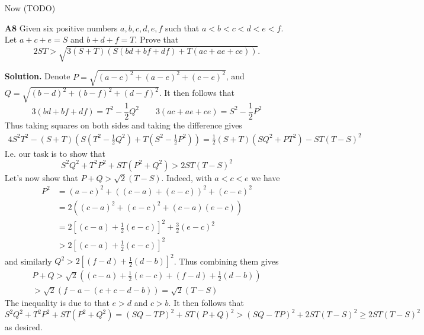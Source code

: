 \documentclass[11pt]{article}
\newcommand{\<}{\langle}
\renewcommand{\>}{\rangle}
\begin{document}
\begin{enumerate}
	Now (TODO)
	
	\item [\textbf{A8}]
	Given six positive numbers $a,b,c,d,e,f$ such that $a < b < c < d < e < f.$ Let $a+c+e=S$ and $b+d+f=T.$ Prove that
	\[2ST > \sqrt{3(S+T)\left(S(bd + bf + df) + T(ac + ae + ce) \right)}.\]
	
	\textbf{Solution.} 
	Denote $P = \sqrt{(a-c)^2 + (a-e)^2 + (c-e)^2}$, and $Q = \sqrt{(b-d)^2 + (b-f)^2 + (d-f)^2}$. 
	It then follows that 
	\begin{equation}
		3(bd + bf + df) = T^2 - \frac 12Q^2
		\qquad 
		3(ac + ae + ce) = S^2 - \frac12 P^2
	\end{equation}
    Thus taking squares on both sides and taking the difference gives 
    \begin{align}
    	4S^2T^2 - (S + T)(S(T^2 - \frac 12Q^2) + T(S^2 - \frac12 P^2))
    	= \frac 12 (S + T)(SQ^2 + PT^2) - ST(T-S)^2
    \end{align}
	 I.e. our task is to show that 
    \begin{equation}
    	S^2Q^2 + T^2P^2 + ST(P^2+Q^2) > 2ST(T-S)^2
    \end{equation}
    Let's now show that $P + Q > \sqrt{2}(T - S)$. 
    Indeed, with $a < c < e$ we have 
    \begin{align}
    	P^2 &
       = (a-c)^2 + ((c-a) + (e-c))^2 + (c-e)^2 
       \nonumber\\
       &= 2((c-a)^2 + (e-c)^2 + (c-a)(e-c)) 
       \nonumber\\
       &= 2[(c-a) + \frac12 (e-c)]^2 + \frac 32 (e-c)^2
       \nonumber\\
       & > 2[(c-a) + \frac12 (e-c)]^2
    \end{align}
    and similarly $Q^2 > 2[(f-d) + \frac12 (d-b)]^2$. 
    Thus combining them gives 
    \begin{equation}
    	\begin{aligned}
    			P + Q > \sqrt{2}((c-a) + \frac12 (e-c) +(f-d) + \frac12 (d-b))
    			\\> \sqrt{2}(f - a -(e + c - d - b))
    			= \sqrt{2}(T - S)
    	\end{aligned}
    	\end{equation}
    The inequality is due to that $e > d$ and $c > b$. 
	It then follows that 
	\begin{equation}
		S^2Q^2 + T^2P^2 + ST(P^2+Q^2)
		=(SQ - TP)^2 + ST(P + Q)^2
		> (SQ - TP)^2 + 2ST(T - S)^2
		\ge 2ST(T - S)^2
	\end{equation}
    as desired. 
    

\end{enumerate}
\end{document}

